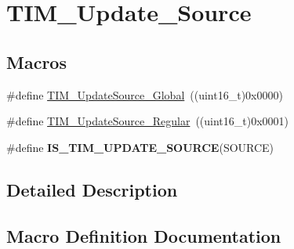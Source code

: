 \hypertarget{group___t_i_m___update___source}{}\section{T\+I\+M\+\_\+\+Update\+\_\+\+Source}
\label{group___t_i_m___update___source}
\subsection*{Macros}
\begin{DoxyCompactItemize}
\item 
\#define \hyperlink{group___t_i_m___update___source_ga32c67bc3f8211a2c7b44ee9fe1523875}{T\+I\+M\+\_\+\+Update\+Source\+\_\+\+Global}~((uint16\+\_\+t)0x0000)
\item 
\#define \hyperlink{group___t_i_m___update___source_ga6f50423cdb011137ae8cd303ccd2080c}{T\+I\+M\+\_\+\+Update\+Source\+\_\+\+Regular}~((uint16\+\_\+t)0x0001)
\item 
\#define {\bfseries I\+S\+\_\+\+T\+I\+M\+\_\+\+U\+P\+D\+A\+T\+E\+\_\+\+S\+O\+U\+R\+C\+E}(S\+O\+U\+R\+C\+E)
\end{DoxyCompactItemize}


\subsection{Detailed Description}


\subsection{Macro Definition Documentation}
\hypertarget{group___t_i_m___update___source_ga7c916798d8f5f4a828afadceb5d38a95}{}
